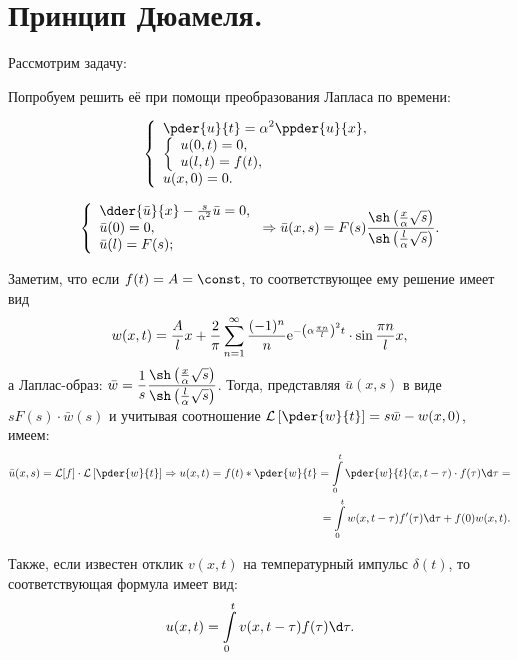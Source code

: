 \chapter{Принцип Дюамеля.}

\begin{minipage}{.55\textwidth}
    Рассмотрим задачу:

    Попробуем решить её при помощи преобразования Лапласа по времени:
\end{minipage}
\hfill
\begin{minipage}{.4\textwidth}
    \[
        \left\{ \begin{array}{l}
            \ds \pder{u}{t} = \alpha^2 \ppder{u}{x}, \\
                \left\{ \begin{array}{l}
                    u(0, t) = 0, \\
                    u(l, t) = f(t),
                \end{array} \right. \\
            u(x, 0) = 0.
        \end{array} \right.
    \]
\end{minipage}

\[
    \left\{ \begin{array}{l}
        \dder{\bar{u}}{x} - \frac{s}{\alpha^2}\bar{u} = 0, \\
        \bar{u}(0) = 0, \\
        \bar{u}(l) = F(s);
    \end{array} \right.
    \Rightarrow
    \bar{u}(x, s) = F(s)\frac{\sh\left(\frac{x}{\alpha}\sqrt{s}\right)}
    {\sh\left(\frac{l}{\alpha}\sqrt{s}\right)}.
\]

Заметим, что если \( f(t) = A = \const \), то соответствующее ему решение имеет
вид
\[
    w(x, t) = \frac{A}{l}x + \frac{2}{\pi}\sum\limits_{n=1}^\infty
    \frac{(-1)^n}{n}\mathrm{e}^{-\left(\alpha\frac{\pi n}{l}\right)^2t}\cdot
    \sin\frac{\pi n}{l}x,
\]
а Лаплас-образ: \( \ds \bar{w} = \frac{1}{s}\frac{\sh\left(
\frac{x}{\alpha}\sqrt{s}\right)}{\sh\left(\frac{l}{\alpha}\sqrt{s}\right)} \).
Тогда, представляя \( \bar{u}(x, s) \) в виде \( sF(s)\cdot\bar{w}(s) \) и
учитывая соотношение
\( \ds \mathcal{L}\left[\pder{w}{t}\right] = s\bar{w} - w(x, 0) \), имеем:
\begin{align*}
    \bar{u}(x, s) = \mathcal{L}[f]\cdot \mathcal{L}\left[\pder{w}{t}\right]
    \Rightarrow u(x, t) = f(t)*\pder{w}{t} =
    \int\limits_0^t \pder{w}{t}(x, t-\tau)\cdot f(\tau)\d\tau = \\
    = \int\limits_0^t w(x, t - \tau)f'(\tau)\d\tau + f(0)w(x, t).
\end{align*}

Также, если известен отклик \( v(x, t) \) на температурный импульс
\( \delta(t) \), то соответствующая формула имеет вид:
\[
    u(x, t) = \int\limits_0^t v(x, t - \tau)f(\tau)\d\tau.
\]

\newpage
